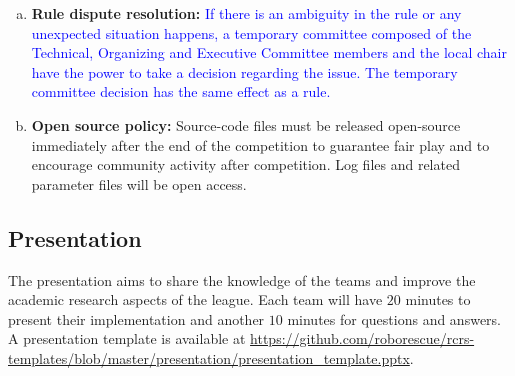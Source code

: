 \documentclass{article}
\begin{document}
\begin{enumerate}[(a)]
\item \textbf{Rule dispute resolution:} \textcolor{blue}{If there is an ambiguity in the rule or any unexpected situation happens, a temporary committee composed of the Technical, Organizing and Executive Committee members and the local chair have the power to take a decision regarding the issue. The temporary committee decision has the same effect as a rule.}
\item \textbf{Open source policy:} Source-code files must be released open-source immediately after the end of the competition to guarantee fair play and to encourage community activity after competition. Log files and related parameter files will be open access.
\end{enumerate}
\subsection{Presentation}
\label{sec:presentation}
The presentation aims to share the knowledge of the teams and improve the academic research aspects of the league. Each team will have $20$ minutes to present their implementation and another $10$ minutes for questions and answers. A presentation template is available at \url{https://github.com/roborescue/rcrs-templates/blob/master/presentation/presentation_template.pptx}.
\end{document}
